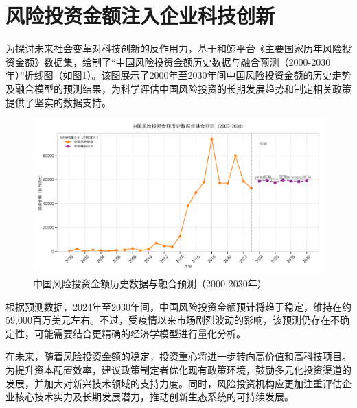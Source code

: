 \section{风险投资金额注入企业科技创新}
为探讨未来社会变革对科技创新的反作用力，基于和鲸平台《主要国家历年风险投资金额》数据集，绘制了“中国风险投资金额历史数据与融合预测（2000-2030年）”折线图（如图\ref{中国风险投资金额历史数据与融合预测（2000-2030年）}）。该图展示了2000年至2030年间中国风险投资金额的历史走势及融合模型的预测结果，为科学评估中国风险投资的长期发展趋势和制定相关政策提供了坚实的数据支持。

\begin{figure}[H]
    \centering
    \includegraphics[width=0.7\linewidth]{figure/14中国风险投资金额历史数据与融合预测.png}
    \caption{中国风险投资金额历史数据与融合预测（2000-2030年）}
    \label{中国风险投资金额历史数据与融合预测（2000-2030年）}
\end{figure}

根据预测数据，2024年至2030年间，中国风险投资金额预计将趋于稳定，维持在约59,000百万美元左右。不过，受疫情以来市场剧烈波动的影响，该预测仍存在不确定性，可能需要结合更精确的经济学模型进行量化分析。

在未来，随着风险投资金额的稳定，投资重心将进一步转向高价值和高科技项目。为提升资本配置效率，建议政策制定者优化现有政策环境，鼓励多元化投资渠道的发展，并加大对新兴技术领域的支持力度。同时，风险投资机构应更加注重评估企业核心技术实力及长期发展潜力，推动创新生态系统的可持续发展。
